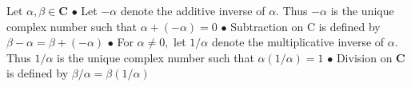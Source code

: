 


Let $\alpha, \beta \in \mathbf{C}$
$\bullet$ Let $-\alpha$ denote the additive inverse of $\alpha .$ Thus $-\alpha$ is the unique complex number such that
$
\alpha+(-\alpha)=0
$
$\bullet$ Subtraction on $\mathrm{C}$ is defined by
$
\beta-\alpha=\beta+(-\alpha)
$
$\bullet$ For $\alpha \neq 0,$ let $1 / \alpha$ denote the multiplicative inverse of $\alpha .$ Thus $1 / \alpha$ is the unique complex number such that
$
\alpha(1 / \alpha)=1
$
$\bullet$ Division on $\mathbf{C}$ is defined by
$
\beta / \alpha=\beta(1 / \alpha)
$

